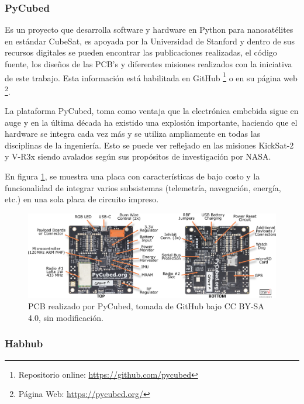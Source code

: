 \newpage

\subsubsection{PyCubed} \label{ssct:intro:pycuebed}

Es un proyecto que desarrolla software y hardware en Python para  nanosatélites en estándar CubeSat, es apoyada por la Universidad de Stanford y dentro de sus recursos digitales se pueden encontrar las publicaciones realizadas, el código fuente, los diseños de las PCB's y diferentes misiones realizados con la iniciativa de este trabajo. Esta información  está habilitada en GitHub \footnote{Repositorio online: \url{https://github.com/pycubed}} o en su página web \footnote{Página Web: \url{https://pycubed.org/} }. 

La plataforma PyCubed, toma como ventaja que la electrónica embebida sigue en auge y en la última década ha existido una explosión importante, haciendo que el hardware se integra cada vez más y se utiliza ampliamente en todas las disciplinas de la ingeniería.  Esto se puede ver reflejado en las misiones KickSat-2 \cite{pycubed_kicksat-2}  y V-R3x \cite{pycubed_v-r3x} siendo avalados según sus propósitos de investigación por NASA.

En figura \ref{fig:ejemplo_pycubed}, se muestra una placa con características de bajo costo y la funcionalidad de integrar varios subsistemas (telemetría, navegación, energía, etc.) en una sola placa de circuito impreso.

\begin{figure}[!ht]
    \centering
    \includegraphics[width=0.75\linewidth]{document/figures/01_pycubed_ejemplo.jpg}
    \caption{PCB realizado por PyCubed, tomada de GitHub bajo CC BY-SA 4.0, sin modificación.}
    \label{fig:ejemplo_pycubed}
\end{figure}

\subsubsection{Habhub} \label{ssct:intro:habhub}


